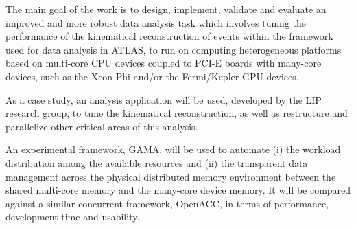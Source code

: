 The main goal of the work is to design, implement, validate and evaluate an improved and more robust data analysis task which involves tuning the performance of the kinematical reconstruction of events within the framework used for data analysis in ATLAS, to run on computing heterogeneous platforms based on multi-core CPU devices coupled to PCI-E boards with many-core devices, such as the \intel Xeon Phi and/or the \nvidia Fermi/Kepler GPU devices.

As a case study, an analysis application will be used, developed by the LIP research group, to tune the kinematical reconstruction, as well as restructure and parallelize other critical areas of this analysis.

An experimental framework, GAMA, will be used to automate (i) the workload distribution among the available resources and (ii) the transparent data management across the physical distributed memory environment between the shared multi-core memory and the many-core device memory. It will be compared against a similar concurrent framework, OpenACC, in terms of performance, development time and usability.

\newpage
{}
